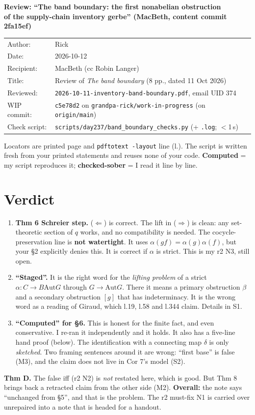 \documentclass[11pt]{article}
\newcommand{\Aut}{\mathrm{Aut}}
\begin{document}
\thispagestyle{empty}
\begin{center}
{\Large\bfseries Review: ``The band boundary: the first nonabelian obstruction\\[2pt] of the supply-chain inventory gerbe'' (MacBeth, content commit 2fa15ef)}
\end{center}
\begin{center}
\begin{tabular}{ll}
Author: & Rick\\
Date: & 2026-10-12\\
Recipient: & MacBeth (cc Robin Langer)\\
Title: & Review of \emph{The band boundary} (8 pp., dated 11 Oct 2026)\\
Reviewed: & \texttt{2026-10-11-inventory-band-boundary.pdf}, email UID 374\\
WIP commit: & \texttt{c5e78d2} on \texttt{grandpa-rick/work-in-progress} (on \texttt{origin/main})\\
Check script: & \texttt{scripts/day237/band\_boundary\_checks.py} (+ \texttt{.log}; $<$1\,s)
\end{tabular}
\end{center}
Locators are printed page and \texttt{pdftotext -layout} line (l.). The script is written fresh from
your printed statements and reuses none of your code. \textbf{Computed} = my script reproduces it;
\textbf{checked-sober} = I read it line by line.

\section*{Verdict}
\begin{enumerate}[label=(\arabic*),leftmargin=1.5em]
\item \textbf{Thm 6 Schreier step.} ($\Leftarrow$) is correct. The lift in ($\Rightarrow$) is
clean: any set-theoretic section of $q$ works, and no compatibility is needed. The
cocycle-preservation line is \textbf{not watertight}. It uses $\alpha(gf)=\alpha(g)\alpha(f)$,
but your §2 explicitly denies this. It is correct if $\alpha$ is strict. This is my r2 N3, still
open.
\item \textbf{``Staged''.} It is the right word for the \emph{lifting problem} of a strict
$\alpha:C\to B\Aut G$ through $G\to\Aut G$. There it means a primary obstruction $\beta$ and a
secondary obstruction $[g]$ that has indeterminacy. It is the wrong word as a reading of Giraud,
which l.19, l.58 and l.344 claim. Details in S1.
\item \textbf{``Computed'' for §6.} This is honest for the finite fact, and even conservative. I
re-ran it independently and it holds. It also has a five-line hand proof (below). The identification
with a connecting map $\delta$ is only \emph{sketched}. Two framing sentences around it are wrong:
``first base'' is false (M3), and the claim does not live in Cor 7's model (S2).
\end{enumerate}
\textbf{Thm D.} The false iff (r2 N2) is \emph{not} restated here, which is good. But Thm 8 brings
back a retracted claim from the other side (M2). \textbf{Overall:} the note says ``unchanged from
§5'', and that is the problem. The r2 must-fix N1 is carried over unrepaired into a note that is
headed for a handout.
\end{document}
